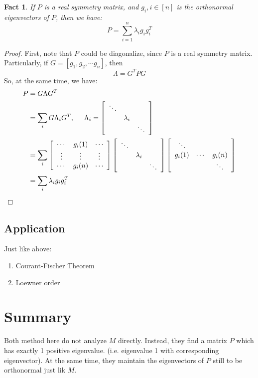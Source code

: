 \documentclass{article}
\newtheorem{fact}{Fact}[section]
\begin{document}
\begin{fact}
  If $P$ is a real symmetry matrix, and $g_i, i\in [n]$ is the orthonormal eigenvectors of $P$, then we have:
  \[P = \sum_{i=1}^n \lambda_i g_i g_i^T\]
\end{fact}
\begin{proof}
  First, note that $P$ could be diagonalize, since $P$ is a real symmetry matrix.
  Particularly, if $G = [g_1, g_2, \cdots g_n]$, then
  \[\Lambda = G^TPG\]
  So, at the same time, we have:
  \begin{align*}
    P
    &= G\Lambda G^T \\
    &= \sum_i G\Lambda_i G^T, \hspace{0.5cm} \Lambda_i = \left[
      \begin{array}{ccc}
        \ddots & & \\
               &\lambda_i& \\
               & & \ddots
      \end{array}
    \right] \\
    &= \sum_i
      \left[
      \begin{array}{ccc}
        \cdots & g_i(1)& \cdots \\
        \vdots & \vdots& \vdots \\
        \cdots & g_i(n)& \cdots
      \end{array}
       \right]
       \left[
      \begin{array}{ccc}
        \ddots & &  \\
         & \lambda_i&  \\
         & & \ddots
      \end{array}
       \right]
      \left[
      \begin{array}{ccc}
        \ddots & &  \\
        g_i(1) & \cdots& g_i(n) \\
         & & \ddots
      \end{array}
             \right] \\
    &= \sum_i \lambda_i g_i g_i^T \qedhere
  \end{align*}
\end{proof}

\subsection{Application}
Just like above:
\begin{enumerate}
\item Courant-Fischer Theorem
\item Loewner order
\end{enumerate}

\section{Summary}
Both method here do not analyze $M$ directly.
Instead, they find a matrix $P$ which has exactly 1 positive eigenvalue. (i.e. eigenvalue 1 with corresponding eigenvector).
At the same time, they maintain the eigenvectors of $P$ still to be orthonormal just lik $M$.



\end{document}
